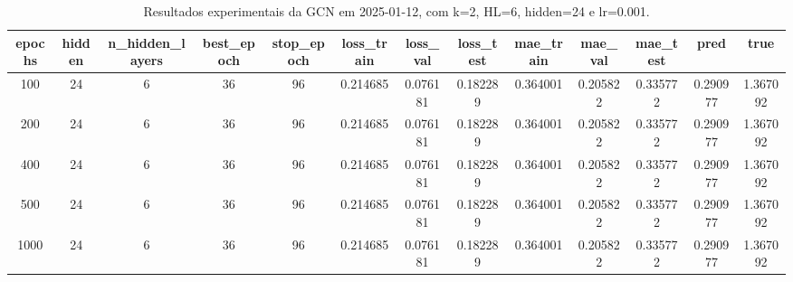 \begin{table}[h]
\centering
\caption{Resultados experimentais da GCN em 2025-01-12, com k=2, HL=6, hidden=24 e lr=0.001.}
\label{tab:gcn_results_k2_hl6_h24_d20250112}
\begin{tabular}{ccccccccccccc}
\toprule
epochs & hidden & n\_hidden\_layers & best\_epoch & stop\_epoch & loss\_train & loss\_val & loss\_test & mae\_train & mae\_val & mae\_test & pred & true \\
\midrule
100 & 24 & 6 & 36 & 96 & 0.214685 & 0.076181 & 0.182289 & 0.364001 & 0.205822 & 0.335772 & 0.290977 & 1.367092 \\
200 & 24 & 6 & 36 & 96 & 0.214685 & 0.076181 & 0.182289 & 0.364001 & 0.205822 & 0.335772 & 0.290977 & 1.367092 \\
400 & 24 & 6 & 36 & 96 & 0.214685 & 0.076181 & 0.182289 & 0.364001 & 0.205822 & 0.335772 & 0.290977 & 1.367092 \\
500 & 24 & 6 & 36 & 96 & 0.214685 & 0.076181 & 0.182289 & 0.364001 & 0.205822 & 0.335772 & 0.290977 & 1.367092 \\
1000 & 24 & 6 & 36 & 96 & 0.214685 & 0.076181 & 0.182289 & 0.364001 & 0.205822 & 0.335772 & 0.290977 & 1.367092 \\
\bottomrule
\end{tabular}
\end{table}
